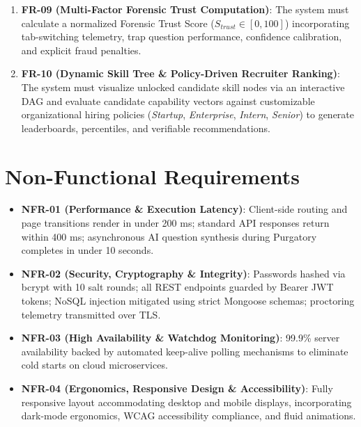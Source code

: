 \begin{enumerate}
    \item \textbf{FR-09 (Multi-Factor Forensic Trust Computation)}: The system must calculate a normalized Forensic Trust Score ($S_{trust} \in [0, 100]$) incorporating tab-switching telemetry, trap question performance, confidence calibration, and explicit fraud penalties.
    \item \textbf{FR-10 (Dynamic Skill Tree \& Policy-Driven Recruiter Ranking)}: The system must visualize unlocked candidate skill nodes via an interactive DAG and evaluate candidate capability vectors against customizable organizational hiring policies (\textit{Startup}, \textit{Enterprise}, \textit{Intern}, \textit{Senior}) to generate leaderboards, percentiles, and verifiable recommendations.
\end{enumerate}

\section{Non-Functional Requirements}
\begin{itemize}
    \item \textbf{NFR-01 (Performance \& Execution Latency)}: Client-side routing and page transitions render in under 200 ms; standard API responses return within 400 ms; asynchronous AI question synthesis during Purgatory completes in under 10 seconds.
    \item \textbf{NFR-02 (Security, Cryptography \& Integrity)}: Passwords hashed via bcrypt with 10 salt rounds; all REST endpoints guarded by Bearer JWT tokens; NoSQL injection mitigated using strict Mongoose schemas; proctoring telemetry transmitted over TLS.
    \item \textbf{NFR-03 (High Availability \& Watchdog Monitoring)}: 99.9\% server availability backed by automated keep-alive polling mechanisms to eliminate cold starts on cloud microservices.
    \item \textbf{NFR-04 (Ergonomics, Responsive Design \& Accessibility)}: Fully responsive layout accommodating desktop and mobile displays, incorporating dark-mode ergonomics, WCAG accessibility compliance, and fluid animations.
\end{itemize}

